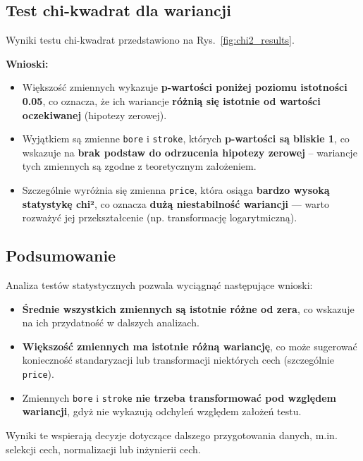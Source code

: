\documentclass[12pt,a4paper]{article}
\begin{document}
\subsection{Test chi-kwadrat dla wariancji}

Wyniki testu chi-kwadrat przedstawiono na Rys.~\ref{fig:chi2_results}.

\textbf{Wnioski:}

\begin{itemize}
    \item Większość zmiennych wykazuje \textbf{p-wartości poniżej poziomu istotności 0.05}, co oznacza, że ich wariancje \textbf{różnią się istotnie od wartości oczekiwanej} (hipotezy zerowej).
    \item Wyjątkiem są zmienne \texttt{bore} i \texttt{stroke}, których \textbf{p-wartości są bliskie 1}, co wskazuje na \textbf{brak podstaw do odrzucenia hipotezy zerowej} – wariancje tych zmiennych są zgodne z teoretycznym założeniem.
    \item Szczególnie wyróżnia się zmienna \texttt{price}, która osiąga \textbf{bardzo wysoką statystykę chi²}, co oznacza \textbf{dużą niestabilność wariancji} — warto rozważyć jej przekształcenie (np. transformację logarytmiczną).
\end{itemize}

\subsection{Podsumowanie}

Analiza testów statystycznych pozwala wyciągnąć następujące wnioski:

\begin{itemize}
    \item \textbf{Średnie wszystkich zmiennych są istotnie różne od zera}, co wskazuje na ich przydatność w dalszych analizach.
    \item \textbf{Większość zmiennych ma istotnie różną wariancję}, co może sugerować konieczność standaryzacji lub transformacji niektórych cech (szczególnie \texttt{price}).
    \item Zmiennych \texttt{bore} i \texttt{stroke} \textbf{nie trzeba transformować pod względem wariancji}, gdyż nie wykazują odchyleń względem założeń testu.
\end{itemize}

Wyniki te wspierają decyzje dotyczące dalszego przygotowania danych, m.in. selekcji cech, normalizacji lub inżynierii cech.
\end{document}
